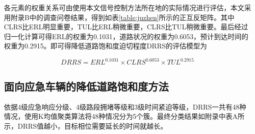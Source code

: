 
各元素的权重关系可由使用本文信号控制方法所在地的实际情况进行评估，本文采用附录B中的调查问卷结果，得到如表\ref{table:juzhen}所示的正互反矩阵。其中CLRS比ERL明显重要，TUL比ERL稍微重要，CLRS比TUL稍微重要。最后经过归一化计算可得ERL的权重为0.1031，道路状况的权重为0.6053，预计到达时间的权重为0.2915。即可得降低道路饱和度迫切程度DRRS的评估模型为

\begin{equation}
	\label{equation:DRRS}
	DRRS={ERL}^{0.1031}\times{CLRS}^{0.6053}\times{TUL}^{0.2915} 
\end{equation}

\subsection{面向应急车辆的降低道路饱和度方法}

依据4级应急响应分级、4级路段拥堵等级和3级时间紧迫等级，DRRS一共有48种情况，使用K均值聚类算法将48种情况分为5个簇。最终分类结果如附录中表A所示，DRRS值越小，目标相位需要延长的时间就越长。



